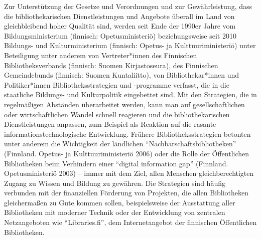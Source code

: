 \documentclass[a4paper,
fontsize=11pt,
oneside,
numbers=noperiodatend,
parskip=half-,
bibliography=totoc,
final
]{scrartcl}
\begin{document}
Zur Unterstützung der Gesetze und Verordnungen und zur Gewährleistung,
dass die bibliothekarischen Dienstleistungen und Angebote überall im
Land von gleichbleibend hoher Qualität sind, werden seit Ende der 1990er
Jahre vom Bildungsministerium (finnisch: Opetusministeriö)
beziehungsweise seit 2010 Bildungs- und Kulturministerium (finnisch:
Opetus- ja Kulttuuriministeriö) unter Beteiligung unter anderem von
Vertreter*innen des Finnischen Bibliotheksverbands (finnisch: Suomen
Kirjastoseura), des Finnischen Gemeindebunds (finnisch: Suomen
Kuntaliitto), von Bibliothekar*innen und Politiker*innen
Bibliotheksstrategien und -programme verfasst, die in die staatliche
Bildungs- und Kulturpolitik eingebettet sind. Mit den Strategien, die in
regelmäßigen Abständen überarbeitet werden, kann man auf
gesellschaftlichen oder wirtschaftlichen Wandel schnell reagieren und
die bibliothekarischen Dienstleistungen anpassen, zum Beispiel als
Reaktion auf die rasante informationstechnologische Entwicklung. Frühere
Bibliotheksstrategien betonten unter anderem die Wichtigkeit der
ländlichen \enquote{Nachbarschaftsbibliotheken} (Finnland. Opetus- ja
Kulttuuriministeriö 2006) oder die Rolle der Öffentlichen Bibliotheken
beim Verhindern einer \enquote{digital information gap} (Finnland.
Opetusministeriö 2003) -- immer mit dem Ziel, allen Menschen
gleichberechtigten Zugang zu Wissen und Bildung zu gewähren. Die
Strategien sind häufig verbunden mit der finanziellen Förderung von
Projekten, die allen Bibliotheken gleichermaßen zu Gute kommen sollen,
beispielsweise der Ausstattung aller Bibliotheken mit moderner Technik
oder der Entwicklung von zentralen Netzangeboten wie
\enquote{Libraries.fi}, dem Internetangebot der finnischen Öffentlichen
Bibliotheken.
\end{document}
